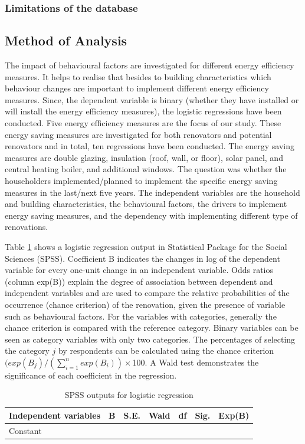 \documentclass[preprint,12pt,3p]{elsarticle}
\begin{document}
\subsubsection{Limitations of the database}


\subsection{Method of Analysis}

 The impact of behavioural factors are investigated for different energy efficiency measures. It helps to realise that besides to building characteristics which behaviour changes are important to implement different energy efficiency measures. Since, the dependent variable is binary (whether they have installed or will install the energy efficiency measures), the logistic regressions have been conducted. Five energy efficiency measures are the focus of our study. These energy saving measures are investigated for both renovators and potential renovators and in total, ten regressions have been conducted. The energy saving measures are double glazing, insulation (roof, wall, or floor), solar panel, and central heating boiler, and additional windows. The question was whether the householders implemented/planned to implement the specific energy saving measures in the last/next five years. The independent variables are the household and building characteristics, the behavioural factors, the drivers to implement energy saving measures, and the dependency with implementing different type of renovations.

Table \ref{tab:3} shows a logistic regression output in Statistical Package for the Social Sciences (SPSS). Coefficient B indicates the changes in log of the dependent variable for every one-unit change in an independent variable. Odds ratios (column exp(B)) explain the degree of association between dependent and independent variables and are used to compare the relative probabilities of the occurrence (chance criterion) of the renovation, given the presence of variable such as behavioural factors. For the variables with categories, generally the chance criterion is compared with the reference category. Binary variables can be seen as category variables with only two categories. The percentages of selecting the category $j$ by respondents can be calculated using the chance criterion $(exp(B_j)/(\sum^n_{i=1} exp(B_i))\times$100. A Wald test demonstrates the significance of each coefficient in the regression.

\begin{table}[H]
\caption{SPSS outputs for logistic regression}
\centering
\footnotesize
\begin{tabular}{@{}lllllll@{}}
\toprule
Independent variables & B & S.E. & Wald & df & Sig. & Exp(B) \\ \midrule
Constant &  &  &  &  &  &  \\ \bottomrule
\end{tabular}
\label{tab:3}
\end{table}
\end{document}
